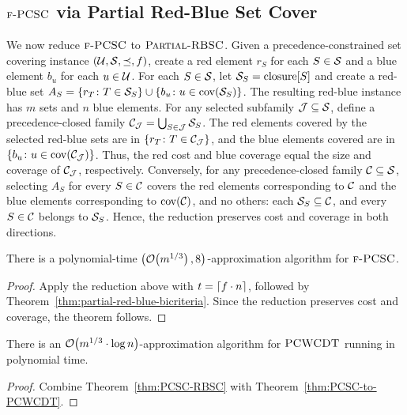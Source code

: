 \subsection{\texorpdfstring{$\textup{\textsc{f-PCSC}}$}{PCSC} via Partial Red-Blue Set Cover}
\label{subsection:PCSC}
We now reduce $\textup{\textsc{f-PCSC}}$ to $\textup{\textsc{Partial-RBSC}}$.
Given a precedence-constrained set covering instance $(\mathcal{U},\mathcal{S},\preceq,f)$, create a red element $r_S$ for each $S\in\mathcal{S}$ and a blue element $b_u$ for each $u\in\mathcal{U}$. For each $S\in\mathcal{S}$, let $\mathcal{S}_S=\operatorname{closure}[S]$ and create a red-blue set $A_S=\mathopen{}\left\{ r_T\colon T\in \mathcal{S}_S \right\}\cup\mathopen{}\left\{ b_u\colon u\in\operatorname{cov}\mathopen{}\left( \mathcal{S}_S \right) \right\}$.
The resulting red-blue instance has $m$ sets and $n$ blue elements. For any selected subfamily $\mathcal{J}\subseteq\mathcal{S}$, define a precedence-closed family $\mathcal{C}_{\mathcal{J}}=\bigcup_{S\in\mathcal{J}}\mathcal{S}_S$.
The red elements covered by the selected red-blue sets are in $\mathopen{}\left\{ r_T\colon T\in\mathcal{C}_{\mathcal{J}} \right\}$, and the blue elements covered are in $\mathopen{}\left\{ b_u\colon u\in\operatorname{cov}\mathopen{}\left( \mathcal{C}_{\mathcal{J}} \right) \right\}$.
Thus, the red cost and blue coverage equal the size and coverage of $\mathcal{C}_{\mathcal{J}}$, respectively.
Conversely, for any precedence-closed family $\mathcal{C}\subseteq\mathcal{S}$, selecting $A_S$ for every $S\in\mathcal{C}$ covers the red elements corresponding to $\mathcal{C}$ and the blue elements corresponding to $\operatorname{cov}\mathopen{}\left( \mathcal{C} \right)$, and no others: each $\mathcal{S}_S\subseteq\mathcal{C}$, and every $S\in\mathcal{C}$ belongs to $\mathcal{S}_S$. Hence, the reduction preserves cost and coverage in both directions.

\begin{theorem}\label{thm:PCSC-RBSC}
There is a polynomial-time $\mathopen{}\left( \mathcal{O}\mathopen{}\left( m^{1/3} \right),8 \right)$-approximation algorithm for $\textup{\textsc{f-PCSC}}$.
\end{theorem}
\begin{proof}
Apply the reduction above with $t=\mathopen{}\left\lceil f\cdot n \right\rceil$, followed by Theorem~\ref{thm:partial-red-blue-bicriteria}. Since the reduction preserves cost and coverage, the theorem follows.
\end{proof}

\begin{corollary}\label{cor:bicriteria-decision-trees}
There is an $\mathcal{O}\mathopen{}\left( m^{1/3}\cdot\log n \right)$-approximation algorithm for $\textup{\textsc{PCWCDT}}$ running in polynomial time.
\end{corollary}
\begin{proof}
Combine Theorem~\ref{thm:PCSC-RBSC} with Theorem~\ref{thm:PCSC-to-PCWCDT}.
\end{proof}


